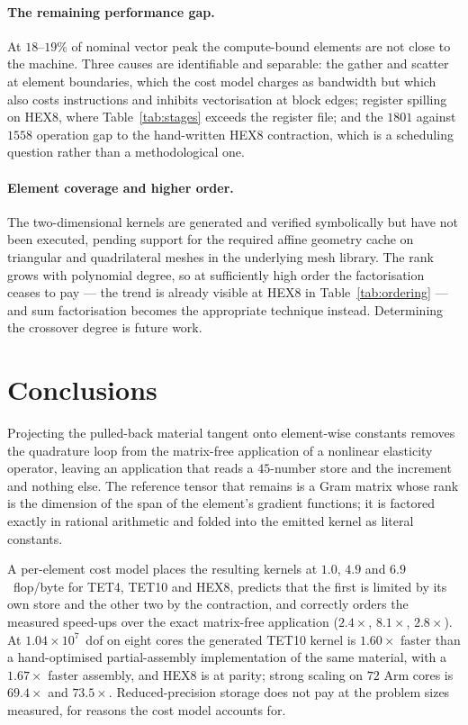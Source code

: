 \documentclass[11pt]{article}
\begin{document}
\paragraph{The remaining performance gap.}  At $18$--$19\%$ of nominal vector peak
the compute-bound elements are not close to the machine.  Three causes are
identifiable and separable: the gather and scatter at element boundaries, which
the cost model charges as bandwidth but which also costs instructions and
inhibits vectorisation at block edges; register spilling on HEX8, where
Table~\ref{tab:stages} exceeds the register file; and the $1801$ against $1558$
operation gap to the hand-written HEX8 contraction, which is a scheduling
question rather than a methodological one.

\paragraph{Element coverage and higher order.}  The two-dimensional kernels are
generated and verified symbolically but have not been executed, pending support
for the required affine geometry cache on triangular and quadrilateral meshes in
the underlying mesh library.  The rank grows with polynomial degree, so at
sufficiently high order the factorisation ceases to pay --- the trend is already
visible at HEX8 in Table~\ref{tab:ordering} --- and sum factorisation becomes the
appropriate technique instead.  Determining the crossover degree is future work.

\section{Conclusions}

Projecting the pulled-back material tangent onto element-wise constants removes
the quadrature loop from the matrix-free application of a nonlinear elasticity
operator, leaving an application that reads a $45$-number store and the
increment and nothing else.  The reference tensor that remains is a Gram matrix
whose rank is the dimension of the span of the element's gradient functions; it
is factored exactly in rational arithmetic and folded into the emitted kernel as
literal constants.

A per-element cost model places the resulting kernels at $1.0$, $4.9$ and
$6.9$~flop/byte for TET4, TET10 and HEX8, predicts that the first is limited by
its own store and the other two by the contraction, and correctly orders the
measured speed-ups over the exact matrix-free application ($2.4\times$,
$8.1\times$, $2.8\times$).  At $1.04\times10^{7}$~dof on eight cores the
generated TET10 kernel is $1.60\times$ faster than a hand-optimised
partial-assembly implementation of the same material, with a $1.67\times$ faster
assembly, and HEX8 is at parity; strong scaling on $72$ Arm cores is $69.4\times$
and $73.5\times$.  Reduced-precision storage does not pay at the problem sizes
measured, for reasons the cost model accounts for.
\end{document}
